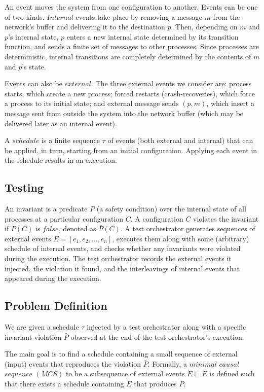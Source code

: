 An event moves the system from one configuration to another. Events can be one of two kinds. $Internal$ events
take place by removing a message $m$ from the network's buffer and delivering it to the destination $p$. Then, depending on $m$ and $p$'s internal state, $p$ enters a new internal state determined by its transition function, and sends a finite set of messages to other processes. Since processes are deterministic, internal transitions are completely determined by the contents of $m$ and $p$'s state.

Events can also be $external$. The three external events we consider are: process starts, which create a new process; forced restarts (crash-recoveries), which force a process to its initial state; and external message sends $(p,m)$, which insert a message sent from outside the system into the network buffer (which may be delivered later as an internal event).

A $schedule$ is a finite sequence $\tau$ of events (both external and internal) that can be applied, in turn, starting from an initial configuration. Applying each event in the schedule results in an execution.

\subsection{Testing}
An invariant is a predicate $P$ (a safety condition) over the internal state of all processes at a particular configuration $C$. A configuration $C$ violates the invariant if $P(C)$ is $false$, denoted as $\bar{P}(C)$. A test orchestrator generates sequences of external events $E = $$[e_1,e_2,...,e_n]$, executes them along with some (arbitrary) schedule of internal events, and checks whether any invariants were violated during the execution. The test orchestrator records the external events it injected, the violation it found, and the interleavings of internal events that appeared during the execution.

\subsection{Problem Definition}
We are given a schedule $\tau$ injected by a test orchestrator along with a specific invariant violation $\bar{P}$ observed at the end of the test orchestrator’s execution.

The main goal is to find a schedule containing a small sequence of external (input) events that reproduces the
violation $\bar{P}$. Formally, a $minimal$ $causal$ $sequence$ $(MCS)$ to be a subsequence of external events
$\acute{E} \sqsubseteq  E$ is defined such that there exists a schedule containing $\acute{E}$ that produces $\bar{P}$.

